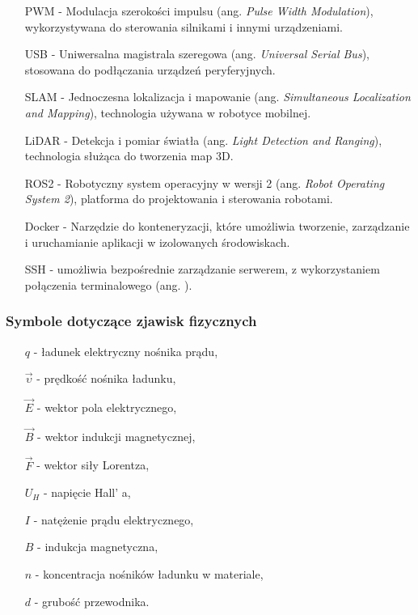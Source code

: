 \begin{itemize}
    \item[PWM] - Modulacja szerokości impulsu (ang. \textit{Pulse Width Modulation}), wykorzystywana do sterowania silnikami i innymi urządzeniami.
    \item[USB] - Uniwersalna magistrala szeregowa (ang. \textit{Universal Serial Bus}), stosowana do podłączania urządzeń peryferyjnych.
    \item[SLAM] - Jednoczesna lokalizacja i mapowanie (ang. \textit{Simultaneous Localization and Mapping}), technologia używana w robotyce mobilnej.
    \item[LiDAR] - Detekcja i pomiar światła (ang. \textit{Light Detection and Ranging}), technologia służąca do tworzenia map 3D.
    \item[ROS2] - Robotyczny system operacyjny w wersji 2 (ang. \textit{Robot Operating System 2}), platforma do projektowania i sterowania robotami.
    \item[Docker] - Narzędzie do konteneryzacji, które umożliwia tworzenie, zarządzanie i uruchamianie aplikacji w izolowanych środowiskach. 
    \item[SSH] - umożliwia bezpośrednie zarządzanie serwerem, z wykorzystaniem połączenia terminalowego (ang. ).
\end{itemize}

\subsubsection*{Symbole dotyczące zjawisk fizycznych}
\begin{itemize}
    \item[\(q\)] - ładunek elektryczny nośnika prądu,
    \item[\(\vec{\upsilon}\)] - prędkość nośnika ładunku,
    \item[] \item[\(\vec{E} \)] - wektor pola elektrycznego,
    \item[\(\vec{B}\)] - wektor indukcji magnetycznej,
    \item[\(\vec{F}\)] - wektor siły Lorentza,
    \item[\(U_H\)] - napięcie Hall' a,
    \item[\(I\)] - natężenie prądu elektrycznego,
    \item[\(B\)] - indukcja magnetyczna,
    \item[\(n\)] - koncentracja nośników ładunku w materiale,
    \item[\(d\)] - grubość przewodnika.     
\end{itemize}


